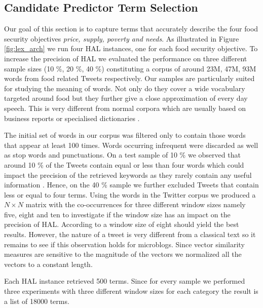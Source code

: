 \subsection{Candidate Predictor Term Selection}

Our goal of this section is to capture terms that accurately describe the four food security objectives \emph{price, supply, poverty and needs}. As illustrated in Figure \ref{fig:lex_arch} we run four HAL instances, one for each food security objective. To increase the precision of HAL we evaluated the performance on three different sample sizes (10 \%, 20 \%, 40 \%) constituting a corpus of around 23M, 47M, 93M words from food related Tweets respectively. Our samples are particularly suited for studying the meaning of words. Not only do they cover a wide vocabulary targeted around food but they further give a close approximation of every day speech. This is very different from normal corpora which are usually based on business reports or specialised dictionaries \cite{burgess98}. 

The initial set of words in our corpus was filtered only to contain those words that appear at least 100 times. Words occurring infrequent were discarded as well as stop words and punctuations. On a test sample of 10 \% we observed that around 10 \% of the Tweets contain equal or less than four words which could impact the precision of the retrieved keywords as they rarely contain any useful information \cite{alexandra15}. Hence, on the 40 \% sample we further excluded Tweets that contain less or equal to four terms. Using the words in the Twitter corpus we produced a $N \times N$ matrix with the co-occurrences for three different window sizes namely five, eight and ten to investigate if the window size has an impact on the precision of HAL. According to \cite{lund96} a window size of eight should yield the best results. However, the nature of a tweet is very different from a classical text so it remains to see if this observation holds for microblogs. Since vector similarity measures are sensitive to the magnitude of the vectors we normalized all the vectors to a constant length. 

Each HAL instance retrieved 500 terms. Since for every sample we performed three experiments with three different window sizes for each category the result is a list of 18000 terms. 

